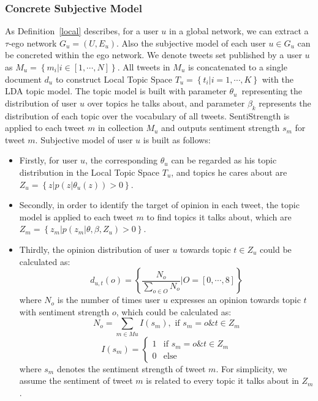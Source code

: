 \documentclass[letterpaper]{article}
\begin{document}
\subsubsection{Concrete Subjective Model}
\label{concrete}
 
As Definition~\ref{local} describes, for a user $ u $ in a global network, we can extract a $ \tau $-ego network $ G_{u}=\left( U,E_{u} \right)  $. 
Also the subjective model of each user $ u \in G_{u} $ can be concreted within the ego network. 
We denote tweets set published by a user $ u $ as $ M_{u}=\left\lbrace m_{i} \vert i \in \left[ 1, \cdots, N \right]  \right\rbrace$. All tweets in $ M_{u} $ is concatenated to a single document $ d_{u} $ to construct Local Topic Space $ T_{u}=\left\lbrace t_{i} \vert i=1, \cdots, K \right\rbrace $ with the LDA topic model.
The topic model is built with parameter $ \theta_{u} $\ representing the distribution of user $ u $ over topics he talks about, and parameter $ \beta_{k} $ represents the distribution of each topic over the vocabulary of all tweets. SentiStrength is applied to each tweet $ m $ in collection $ M_{u} $ and outputs sentiment strength $ s_{m} $ for tweet $ m $. 
Subjective model of user $ u $ is built as follows:
\begin{itemize}
\item Firstly, for user $ u $, the corresponding $ \theta_{u} $ can be regarded as his topic distribution in the Local Topic Space $ T_{u} $, and topics he cares about are $ Z_{u}= \left\lbrace z \vert p\left( z \vert \theta_{u}\left( z \right)  \right)>0 \right\rbrace $.
\item Secondly, in order to identify the target of opinion in each tweet, the topic model is applied to each tweet $ m $ to find topics it talks about, which are $ Z_{m} =\left\lbrace z_{m} \vert p\left( z_{m} \vert \theta, \beta, Z_{u} \right)>0 \right\rbrace $.
\item Thirdly, the opinion distribution of user $ u $ towards topic $ t \in Z_{u} $ could be calculated as: 
\begin{equation}
\label{opinionall}
d_{u,t}\left( o \right) = \left\lbrace \dfrac{N_{o}}{\sum_{o \in O} N_{o}} \vert O=\left[ 0, \cdots, 8 \right] \right\rbrace 
\end{equation}
where $ N_{o} $ is the number of times user $ u $ expresses an opinion towards topic $ t $ with sentiment strength $ o $, which could be calculated as:
\begin{equation}
\label{opinion1}
N_{o}=\sum_{m \in Mu} I\left( s_{m} \right) , \text{ if } s_{m}=o \& t \in Z_{m}
\end{equation}
\begin{equation}
\label{opinion2}
I\left( s_{m} \right)=\left\{
\begin{array}{ll}
{1} & \text{if } s_{m}=o \& t \in Z_{m}\\
{0} & \text{else}
\end{array}
\right.
\end{equation}
where $ s_{m} $ denotes the sentiment strength of tweet $ m $. For simplicity, we assume the sentiment of tweet $ m $ is related to every topic it talks about in $ Z_{m} $.
\end{itemize}
\end{document}
